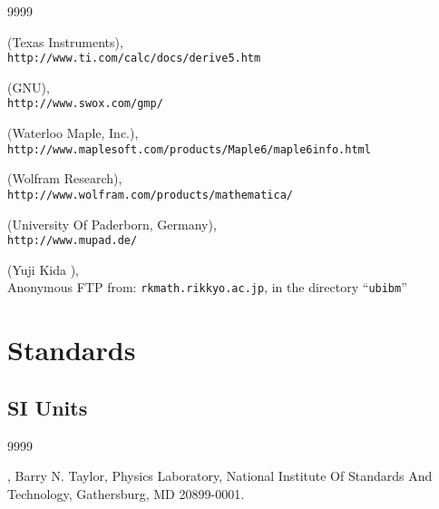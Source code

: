 \begin{thecustombibliography}{9999}


 (Texas Instruments), \\
\texttt{http://www.ti.com/calc/docs/derive5.htm}

 (GNU), \\
\texttt{http://www.swox.com/gmp/}

 (Waterloo Maple, Inc.), \\
\texttt{http://www.maplesoft.com/products/Maple6/maple6info.html}

 (Wolfram Research), \\
\texttt{http://www.wolfram.com/products/mathematica/}

 (University Of Paderborn, Germany), \\
\texttt{http://www.mupad.de/}

 (Yuji Kida \cite{bibref:i:yujikida}), \\
Anonymous FTP from: \texttt{rkmath.rikkyo.ac.jp}, in the directory
``\texttt{ubibm}''

\end{thecustombibliography}



\section*{Standards}

\subsection*{SI Units}

\begin{thecustombibliography}{9999}

,
Barry N. Taylor, Physics Laboratory, National Institute
Of Standards And Technology, Gathersburg, MD 20899-0001.

\end{thecustombibliography}

